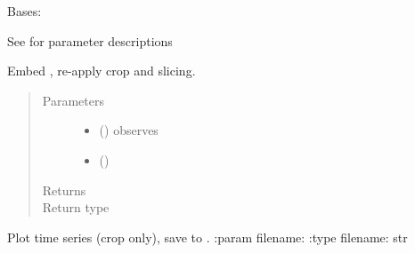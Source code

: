\documentclass[letterpaper,10pt,openany,oneside,english]{sphinxmanual}
\begin{document}
\begin{fulllineitems}
\label{\detokenize{signals:signals.TimeSeries}}
Bases: 

See {\hyperref[\detokenize{signals:signals.BaseTrajectory}]{}} for parameter descriptions

\begin{fulllineitems}
\label{\detokenize{signals:signals.TimeSeries.embed}}
Embed , re-apply crop and slicing.
\begin{quote}\begin{description}
\item[{Parameters}] \leavevmode\begin{itemize}
\item {} 
 () \textendash{} observes 

\item {} 
 () \textendash{} 

\end{itemize}

\item[{Returns}] \leavevmode


\item[{Return type}] \leavevmode
{\hyperref[\detokenize{signals:signals.Trajectory}]{}}

\end{description}\end{quote}

\end{fulllineitems}


\begin{fulllineitems}
\label{\detokenize{signals:signals.TimeSeries.plot}}
Plot time series (crop only), save to .
:param filename:
:type filename: str

\end{fulllineitems}


\end{fulllineitems}
\end{document}

